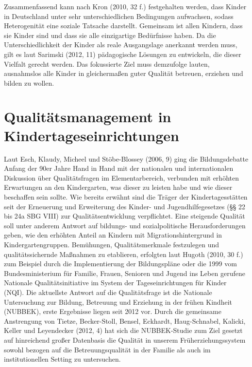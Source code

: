 Zusammenfassend kann nach Kron (2010, 32 f.) festgehalten werden, dass Kinder in Deutschland unter sehr unterschiedlichen Bedingungen aufwachsen, sodass Heterogenität eine soziale Tatsache darstellt. 
Gemeinsam ist allen Kindern, dass sie Kinder sind und dass sie alle einzigartige Bedürfnisse haben. 
Da die Unterschiedlichkeit der Kinder als reale Ausgangslage anerkannt werden muss, gilt es laut Sarimski (2012, 11) pädagogische Lösungen zu entwickeln, die dieser Vielfalt gerecht werden. Das fokussierte Ziel muss demzufolge lauten, ausnahmslos alle Kinder in gleichermaßen guter Qualität betreuen, erziehen und bilden zu wollen.  

\section{Qualitätsmanagement in Kindertageseinrichtungen}

Laut Esch, Klaudy, Micheel und Stöbe-Blossey (2006, 9) ging die Bildungsdebatte Anfang der 90er Jahre Hand in Hand mit der nationalen und internationalen Diskussion über Qualitätsfragen im Elementarbereich, verbunden mit erhöhten Erwartungen an den Kindergarten, was dieser zu leisten habe und wie dieser beschaffen sein sollte. Wie bereits erwähnt sind die Träger der Kindertagesstätten seit der Erneuerung und Erweiterung des Kinder- und Jugendhilfegesetzes (§§ 22 bis 24a SBG VIII) zur Qualitätsentwicklung verpflichtet. Eine steigende Qualität soll unter anderem Antwort auf bildungs- und sozialpolitische Herausforderungen geben, wie den erhöhten Anteil an Kindern mit Migrationshintergrund in Kindergartengruppen.
Bemühungen, Qualitätsmerkmale festzulegen und qualitätssichernde Maßnahmen zu etablieren, erfolgten laut Hugoth (2010, 30 f.) zum Beispiel durch die Implementierung der Bildungspläne oder die 1999 vom Bundesministerium für Familie, Frauen, Senioren und Jugend ins Leben gerufene Nationale Qualitätsinitiative im System der Tageseinrichtungen für Kinder (NQI). Die aktuellste Antwort auf die Qualitätsfrage ist die Nationale Untersuchung zur Bildung, Betreuung und Erziehung in der frühen Kindheit (NUBBEK), erste Ergebnisse liegen seit 2012 vor. Durch die gemeinsame Anstrengung von Tietze, Becker-Stoll, Bensel, Eckhardt, Haug-Schnabel, Kalicki, Keller und Leyendecker (2012, 4) hat sich die  NUBBEK-Studie zum Ziel gesetzt auf hinreichend großer Datenbasis die Qualität in unserem Früherziehungssystem sowohl bezogen auf die Betreuungsqualität in der Familie als auch im institutionellen Setting zu untersuchen. 
  

